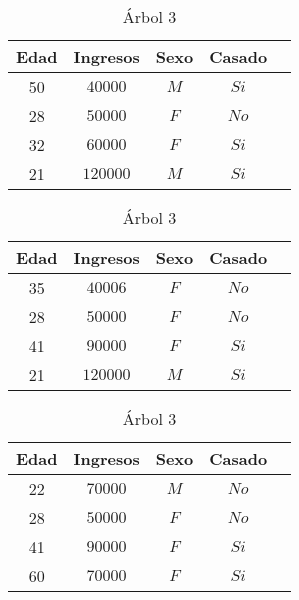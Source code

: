 \documentclass [a4paper] {article}
\begin{document}
\begin{table}[!htb]
\tiny\setlength{\tabcolsep}{1pt}
\begin{minipage}{.33\linewidth}
\centering

\caption{Árbol 1}
\label{tab:first_table}

\medskip

\begin{tabular}{ccccc}
    \toprule
    \textbf{Edad} & \textbf{Ingresos} & \textbf{Sexo} & \textbf{Casado} \\
    \midrule
    50 & $40000$ & $M$ & $Si$ \\
    28 & $50000$ & $F$ & $No$ \\
    32 & $60000$ & $F$ & $Si$ \\
    21 & $120000$ & $M$ & $Si$ \\
\end{tabular}
\end{minipage}\hfill
\begin{minipage}{.3\linewidth}
\centering

\caption{Árbol 2}
\label{tab:second_table}

\medskip

\begin{tabular}{ccccc}
    \toprule
    \textbf{Edad} & \textbf{Ingresos} & \textbf{Sexo} & \textbf{Casado} \\
    \midrule
    35 & $40006$ & $F$ & $No$ \\
    28 & $50000$ & $F$ & $No$ \\
    41 & $90000$ & $F$ & $Si$ \\
    21 & $120000$ & $M$ & $Si$ \\
\end{tabular}    
\end{minipage}\hfill
\begin{minipage}{.3\linewidth}
\centering

\caption{Árbol 3}
\label{tab:third_table}

\medskip

\begin{tabular}{ccccc}
    \toprule
    \textbf{Edad} & \textbf{Ingresos} & \textbf{Sexo} & \textbf{Casado} \\
    \midrule
    22 & $70000$ & $M$ & $No$ \\
    28 & $50000$ & $F$ & $No$ \\
    41 & $90000$ & $F$ & $Si$ \\
    60 & $70000$ & $F$ & $Si$ \\
\end{tabular}    
\end{minipage} 
\end{table}
\end{document}

